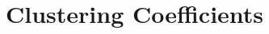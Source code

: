 \documentclass[a4paper]{article}
\begin{document}
\section{Clustering Coefficients}

\begin{enumerate}[label={(4. \alph*)}]    
    
\end{enumerate}


\end{document}
